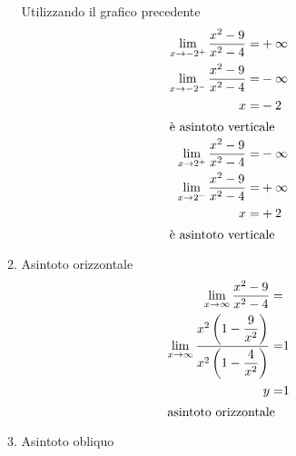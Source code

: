 \begin{exercise}
\begin{itemize}
\begin{enumerate}
		Utilizzando il grafico precedente
		\begin{align*}
		\lim_{x\to -2^+}\dfrac{x^2-9}{x^2-4}=&+\infty\\
		\lim_{x\to -2^-}\dfrac{x^2-9}{x^2-4}=&-\infty\\
		x=&-2\\
		\intertext{è asintoto verticale}
		\lim_{x\to 2^+} \dfrac{x^2-9}{x^2-4}=&-\infty\\
		\lim_{x\to 2^-} \dfrac{x^2-9}{x^2-4}=&+\infty\\
		x=&+2\\
		\intertext{è asintoto verticale}
		\end{align*}
		\item Asintoto orizzontale 
			\begin{align*}
		\lim_{x\to \infty}\dfrac{x^2-9}{x^2-4}=&\\
		\lim_{x\to \infty}\dfrac{x^2\left(1-\dfrac{9}{x^2}\right)}{x^2\left(1-\dfrac{4}{x^2}\right)}=&1\\
		y=&1\\
		\intertext{asintoto orizzontale}
		\end{align*}
		\item Asintoto obliquo
		

\end{enumerate}
\end{itemize}
\end{exercise}
